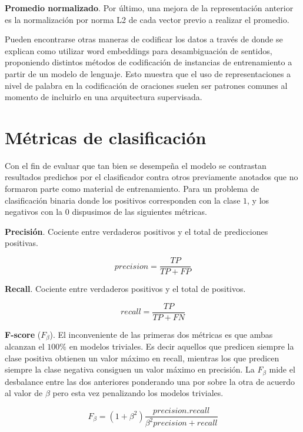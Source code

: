 \textbf{Promedio normalizado}. Por último, una mejora de la representación
anterior es la normalización por norma L2 de cada vector previo a realizar el
promedio.

Pueden encontrarse otras maneras de codificar los datos a través de
\citep{Iacobacci-2016} donde se explican como utilizar word embeddings para
desambiguación de sentidos, proponiendo distintos métodos de codificación de
instancias de entrenamiento a partir de un modelo de lenguaje. Esto muestra que
el uso de representaciones a nivel de palabra en la codificación de oraciones
suelen ser patrones comunes al momento de incluirlo en una arquitectura
supervisada.

\section{Métricas de clasificación}
\label{lit:metrics}

Con el fin de evaluar que tan bien se desempeña el modelo se contrastan
resultados predichos por el clasificador contra otros previamente anotados que
no formaron parte como material de entrenamiento. Para un problema de
clasificación binaria donde los positivos corresponden con la clase $1$, y los
negativos con la $0$ dispusimos de las siguientes métricas.

\textbf{Precisión}. Cociente entre verdaderos positivos y el total de
predicciones positivas.

\begin{equation}
    precision = \frac{TP}{TP + FP}
\end{equation}

\textbf{Recall}. Cociente entre verdaderos positivos y el total de positivos.

\begin{equation}
    recall = \frac{TP}{TP + FN}
\end{equation}

\textbf{F-score} ($F_{\beta}$). El inconveniente de las primeras dos métricas es
que ambas alcanzan el $100\%$ en modelos triviales. Es decir aquellos que
predicen siempre la clase positiva obtienen un valor máximo en recall, mientras
los que predicen siempre la clase negativa consiguen un valor máximo en
precisión. La $F_{\beta}$ mide el desbalance entre las dos anteriores ponderando
una por sobre la otra de acuerdo al valor de $\beta$ pero esta vez penalizando
los modelos triviales.

\begin{equation}
    F_{\beta} = (1 + \beta^2) \frac{precision . recall}{\beta^2 precision + recall}
\end{equation}

